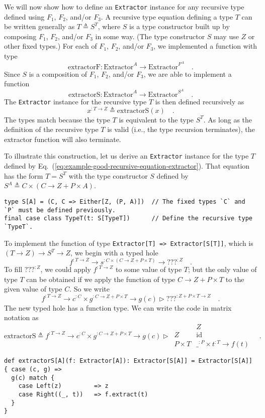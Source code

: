 We will now show how to define an \lstinline!Extractor! instance
for any recursive type defined using $F_{1}$, $F_{2}$, and/or $F_{3}$.
A recursive type equation defining a type $T$ can be written generally
as $T\triangleq S^{T}$, where $S$ is a type constructor built up
by composing $F_{1}$, $F_{2}$, and/or $F_{3}$ in some way. (The
type constructor $S$ may use $Z$ or other fixed types.) For each
of $F_{1}$, $F_{2}$, and/or $F_{3}$, we implemented a function
with type 
\[
\text{extractorF}:\text{Extractor}^{A}\rightarrow\text{Extractor}^{F^{A}}\quad.
\]
Since $S$ is a composition of $F_{1}$, $F_{2}$, and/or $F_{3}$,
we are able to implement a function 
\[
\text{extractorS}:\text{Extractor}^{A}\rightarrow\text{Extractor}^{S^{A}}\quad.
\]
The \lstinline!Extractor! instance for the recursive type $T$ is
then defined recursively as
\[
x^{:T\rightarrow Z}\triangleq\text{extractorS}\left(x\right)\quad.
\]
The types match because the type $T$ is equivalent to the type $S^{T}$.
As long as the definition of the recursive type $T$ is valid (i.e.,
the type recursion terminates), the extractor function will also terminate.

To illustrate this construction, let us derive an \lstinline!Extractor!
instance for the type $T$ defined by Eq.~(\ref{eq:example-good-recursive-equation-extractor}).
That equation has the form $T=S^{T}$ with the type constructor $S$
defined by $S^{A}\triangleq C\times\left(C\rightarrow Z+P\times A\right)$.
\begin{lstlisting}
type S[A] = (C, C => Either[Z, (P, A)])  // The fixed types `C` and `P` must be defined previously.
final case class TypeT(t: S[TypeT])      // Define the recursive type `TypeT`. 
\end{lstlisting}
To implement the function of type \lstinline!Extractor[T] => Extractor[S[T]]!,
which is $\left(T\rightarrow Z\right)\rightarrow S^{T}\rightarrow Z$,
we begin with a typed hole
\[
f^{:T\rightarrow Z}\rightarrow s^{:C\times\left(C\rightarrow Z+P\times T\right)}\rightarrow\text{???}^{:Z}\quad.
\]
To fill $\text{???}^{:Z}$, we could apply $f^{:T\rightarrow Z}$
to some value of type $T$; but the only value of type $T$ can be
obtained if we apply the function of type $C\rightarrow Z+P\times T$
to the given value of type $C$. So we write
\[
f^{:T\rightarrow Z}\rightarrow c^{:C}\times g^{:C\rightarrow Z+P\times T}\rightarrow g(c)\triangleright\text{???}^{:Z+P\times T\rightarrow Z}\quad.
\]
The new typed hole has a function type. We can write the code in matrix
notation as
\[
\text{extractorS}\triangleq f^{:T\rightarrow Z}\rightarrow c^{:C}\times g^{:C\rightarrow Z+P\times T}\rightarrow g(c)\triangleright\,\begin{array}{|c||c|}
 & Z\\
\hline Z & \text{id}\\
P\times T & \_^{:P}\times t^{:T}\rightarrow f(t)
\end{array}\quad.
\]
\begin{lstlisting}
def extractorS[A](f: Extractor[A]): Extractor[S[A]] = Extractor[S[A]] { case (c, g) =>
  g(c) match {
    case Left(z)         => z
    case Right((_, t))   => f.extract(t)
  }
}
\end{lstlisting}

